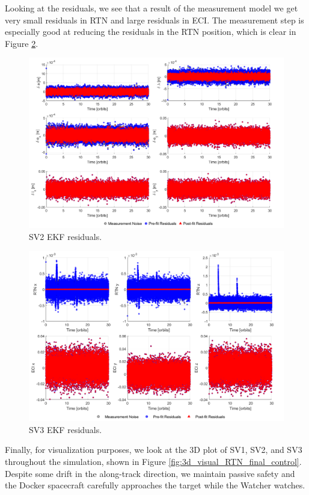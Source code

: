 Looking at the residuals, we see that a result of the measurement model we get very small residuals in RTN and large residuals in ECI. The measurement step is especially good at reducing the residuals in the RTN position, which is clear in Figure \ref{fig:ekf_residuals_sv3_ps9}.

\begin{figure}[H]
    \centering
    \includegraphics[width=0.7\linewidth]{sim/figures/PS9/residuals_SV2.png}
    \caption{SV2 EKF residuals.}
    \label{fig:ekf_residuals_sv2_ps9}
\end{figure}

\begin{figure}[H]
    \centering
    \includegraphics[width=0.7\linewidth]{sim/figures/PS9/residuals_SV3.png}
    \caption{SV3 EKF residuals.}
    \label{fig:ekf_residuals_sv3_ps9}
\end{figure}

Finally, for visualization purposes, we look at the 3D plot of SV1, SV2, and SV3 throughout the simulation, shown in Figure \ref{fig:3d_visual_RTN_final_control}. Despite some drift in the along-track direction, we maintain passive safety and the Docker spacecraft carefully approaches the target while the Watcher watches.

